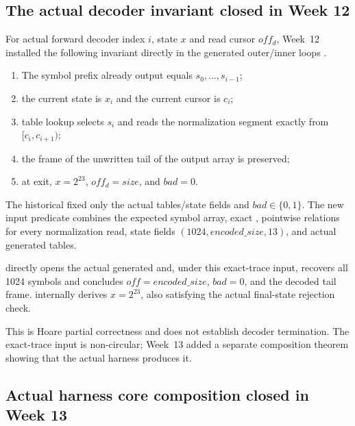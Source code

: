 \subsection{The actual decoder invariant closed in Week 12}

For actual forward decoder index \(i\), state \(x\) and read cursor
\(off_d\), Week~12 installed the following invariant directly in the generated
outer/inner loops \cite{week12-report,rans-decoder-invariant}.

\begin{enumerate}
  \item The symbol prefix already output equals \(s_0,\ldots,s_{i-1}\);
  \item the current state is \(x_i\) and the current cursor is \(c_i\);
  \item table lookup selects \(s_i\) and reads the normalization segment
        exactly from \([c_i,c_{i+1})\);
  \item the frame of the unwritten tail of the output array is preserved;
  \item at exit, \(x=2^{23}\), \(off_d=size\), and \(bad=0\).
\end{enumerate}

The historical  fixed only the
actual tables/state fields and \(bad\in\{0,1\}\). The new input predicate
 combines the expected symbol
array, exact , pointwise relations for every
normalization read, state fields \((1024,encoded\_size,13)\), and actual
generated tables.

\begin{verified}
 directly opens the actual
generated  and, under this exact-trace input, recovers
all 1024 symbols and concludes \(off=encoded\_size\), \(bad=0\), and the decoded
tail frame.  internally derives
\(x=2^{23}\), also satisfying the actual final-state rejection check.
\end{verified}

This is Hoare partial correctness and does not establish decoder termination.
The exact-trace input is non-circular; Week~13 added a separate composition
theorem showing that the actual harness produces it.

\subsection{Actual harness core composition closed in Week 13}

